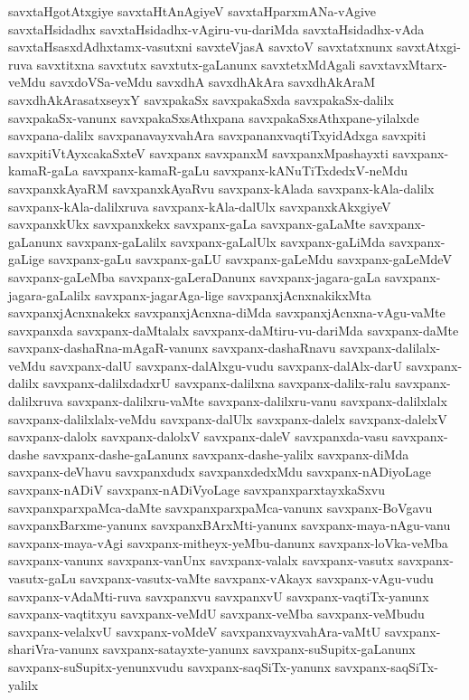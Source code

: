 {savxtaHgotAtxgiye
savxtaHtAnAgiyeV
savxtaHparxmANa-vAgive
savxtaHsidadhx
savxtaHsidadhx-vAgiru-vu-dariMda
savxtaHsidadhx-vAda
savxtaHsasxdAdhxtamx-vasutxni
savxteVjasA
savxtoV
savxtatxnunx
savxtAtxgi-ruva
savxtitxna
savxtutx
savxtutx-gaLanunx
savxtetxMdAgali
savxtavxMtarx-veMdu
savxdoVSa-veMdu
savxdhA
savxdhAkAra
savxdhAkAraM
savxdhAkArasatxseyxY
savxpakaSx
savxpakaSxda
savxpakaSx-dalilx
savxpakaSx-vanunx
savxpakaSxsAthxpana
savxpakaSxsAthxpane-yilalxde
savxpana-dalilx
savxpanavayxvahAra
savxpananxvaqtiTxyidAdxga
savxpiti
savxpitiVtAyxcakaSxteV
savxpanx
savxpanxM
savxpanxMpashayxti
savxpanx-kamaR-gaLa
savxpanx-kamaR-gaLu
savxpanx-kANuTiTxdedxV-neMdu
savxpanxkAyaRM
savxpanxkAyaRvu
savxpanx-kAlada
savxpanx-kAla-dalilx
savxpanx-kAla-dalilxruva
savxpanx-kAla-dalUlx
savxpanxkAkxgiyeV
savxpanxkUkx
savxpanxkekx
savxpanx-gaLa
savxpanx-gaLaMte
savxpanx-gaLanunx
savxpanx-gaLalilx
savxpanx-gaLalUlx
savxpanx-gaLiMda
savxpanx-gaLige
savxpanx-gaLu
savxpanx-gaLU
savxpanx-gaLeMdu
savxpanx-gaLeMdeV
savxpanx-gaLeMba
savxpanx-gaLeraDanunx
savxpanx-jagara-gaLa
savxpanx-jagara-gaLalilx
savxpanx-jagarAga-lige
savxpanxjAcnxnakikxMta
savxpanxjAcnxnakekx
savxpanxjAcnxna-diMda
savxpanxjAcnxna-vAgu-vaMte
savxpanxda
savxpanx-daMtalalx
savxpanx-daMtiru-vu-dariMda
savxpanx-daMte
savxpanx-dashaRna-mAgaR-vanunx
savxpanx-dashaRnavu
savxpanx-dalilalx-veMdu
savxpanx-dalU
savxpanx-dalAlxgu-vudu
savxpanx-dalAlx-darU
savxpanx-dalilx
savxpanx-dalilxdadxrU
savxpanx-dalilxna
savxpanx-dalilx-ralu
savxpanx-dalilxruva
savxpanx-dalilxru-vaMte
savxpanx-dalilxru-vanu
savxpanx-dalilxlalx
savxpanx-dalilxlalx-veMdu
savxpanx-dalUlx
savxpanx-dalelx
savxpanx-dalelxV
savxpanx-dalolx
savxpanx-dalolxV
savxpanx-daleV
savxpanxda-vasu
savxpanx-dashe
savxpanx-dashe-gaLanunx
savxpanx-dashe-yalilx
savxpanx-diMda
savxpanx-deVhavu
savxpanxdudx
savxpanxdedxMdu
savxpanx-nADiyoLage
savxpanx-nADiV
savxpanx-nADiVyoLage
savxpanxparxtayxkaSxvu
savxpanxparxpaMca-daMte
savxpanxparxpaMca-vanunx
savxpanx-BoVgavu
savxpanxBarxme-yanunx
savxpanxBArxMti-yanunx
savxpanx-maya-nAgu-vanu
savxpanx-maya-vAgi
savxpanx-mitheyx-yeMbu-danunx
savxpanx-loVka-veMba
savxpanx-vanunx
savxpanx-vanUnx
savxpanx-valalx
savxpanx-vasutx
savxpanx-vasutx-gaLu
savxpanx-vasutx-vaMte
savxpanx-vAkayx
savxpanx-vAgu-vudu
savxpanx-vAdaMti-ruva
savxpanxvu
savxpanxvU
savxpanx-vaqtiTx-yanunx
savxpanx-vaqtitxyu
savxpanx-veMdU
savxpanx-veMba
savxpanx-veMbudu
savxpanx-velalxvU
savxpanx-voMdeV
savxpanxvayxvahAra-vaMtU
savxpanx-shariVra-vanunx
savxpanx-satayxte-yanunx
savxpanx-suSupitx-gaLanunx
savxpanx-suSupitx-yenunxvudu
savxpanx-saqSiTx-yanunx
savxpanx-saqSiTx-yalilx
}
